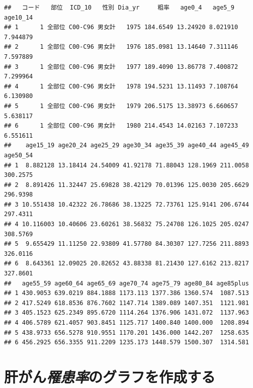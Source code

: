 \documentclass[11pt,]{article}
\begin{document}
\begin{verbatim}
##   コード   部位  ICD_10   性別 Dia_yr     粗率   age0_4   age5_9 age10_14
## 1      1 全部位 C00-C96 男女計   1975 184.6549 13.24920 8.021910 7.944879
## 2      1 全部位 C00-C96 男女計   1976 185.0981 13.14640 7.311146 7.597889
## 3      1 全部位 C00-C96 男女計   1977 189.4090 13.86778 7.400872 7.299964
## 4      1 全部位 C00-C96 男女計   1978 194.5231 13.11493 7.108764 6.130980
## 5      1 全部位 C00-C96 男女計   1979 206.5175 13.38973 6.660657 5.638117
## 6      1 全部位 C00-C96 男女計   1980 214.4543 14.02163 7.107233 6.551611
##    age15_19 age20_24 age25_29 age30_34 age35_39 age40_44 age45_49 age50_54
## 1  8.882128 13.18414 24.54009 41.92178 71.88043 128.1969 211.0058 300.2575
## 2  8.891426 11.32447 25.69828 38.42129 70.01396 125.0030 205.6629 296.9398
## 3 10.551438 10.42322 26.78686 38.13225 72.73761 125.9141 206.6744 297.4311
## 4 10.116003 10.40606 23.60261 38.56832 75.24708 126.1025 205.0247 308.5769
## 5  9.655429 11.11250 22.93809 41.57780 84.30307 127.7256 211.8893 326.0116
## 6  8.643361 12.09025 20.82652 43.88338 81.21430 127.6162 213.8217 327.8601
##   age55_59 age60_64 age65_69 age70_74 age75_79 age80_84 age85plus
## 1 430.9053 639.0219 884.1888 1173.113 1377.386 1360.574  1087.513
## 2 417.5249 618.8536 876.7602 1147.714 1389.089 1407.351  1121.981
## 3 405.1523 625.2349 895.6720 1114.264 1376.906 1431.072  1137.963
## 4 406.5789 621.4057 903.8451 1125.717 1400.840 1400.000  1208.894
## 5 438.9733 656.5278 910.9551 1170.201 1436.000 1442.207  1258.635
## 6 456.2925 656.3355 911.2209 1235.173 1448.579 1500.307  1314.581
\end{verbatim}

\section{\texorpdfstring{肝がん\emph{罹患率}のグラフを作成する}{肝がん罹患率のグラフを作成する}}
\end{document}
